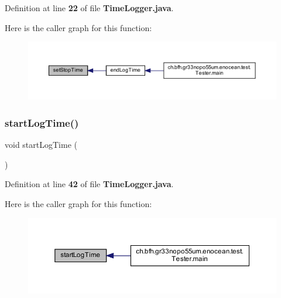 Definition at line {\bf 22} of file {\bf Time\+Logger.\+java}.

Here is the caller graph for this function\+:\nopagebreak
\begin{figure}[H]
\begin{center}
\leavevmode
\includegraphics[width=350pt]{dc/d8d/classch_1_1bfh_1_1gr33nopo55um_1_1enocean_1_1helper_1_1TimeLogger_acc699ee9843a90ddd38933dbaf478dbb_icgraph}
\end{center}
\end{figure}
\label{classch_1_1bfh_1_1gr33nopo55um_1_1enocean_1_1helper_1_1TimeLogger_a1f699668ddc68b1a50c0343cae8dfca3} 
\subsubsection{start\+Log\+Time()}
{\footnotesize\ttfamily void start\+Log\+Time (\begin{DoxyParamCaption}{ }\end{DoxyParamCaption})}



Definition at line {\bf 42} of file {\bf Time\+Logger.\+java}.

Here is the caller graph for this function\+:\nopagebreak
\begin{figure}[H]
\begin{center}
\leavevmode
\includegraphics[width=350pt]{dc/d8d/classch_1_1bfh_1_1gr33nopo55um_1_1enocean_1_1helper_1_1TimeLogger_a1f699668ddc68b1a50c0343cae8dfca3_icgraph}
\end{center}
\end{figure}


